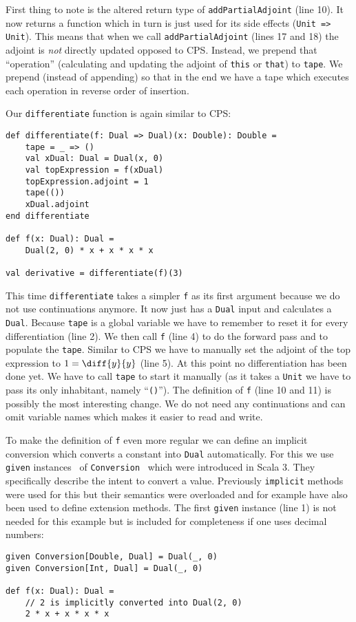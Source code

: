First thing to note is the altered return type of \lstinline{addPartialAdjoint} (line 10). It now returns a function which in turn is just used for its side effects (\lstinline{Unit => Unit}). This means that when we call \lstinline{addPartialAdjoint} (lines 17 and 18) the adjoint is \emph{not} directly updated opposed to CPS. Instead, we prepend that ``operation'' (calculating and updating the adjoint of \lstinline{this} or \lstinline{that}) to \lstinline{tape}. We prepend (instead of appending) so that in the end we have a tape which executes each operation in reverse order of insertion.

Our \lstinline{differentiate} function is again similar to CPS:
\begin{lstlisting}
def differentiate(f: Dual => Dual)(x: Double): Double =
    tape = _ => ()
    val xDual: Dual = Dual(x, 0)
    val topExpression = f(xDual)
    topExpression.adjoint = 1
    tape(())
    xDual.adjoint
end differentiate

def f(x: Dual): Dual =
    Dual(2, 0) * x + x * x * x

val derivative = differentiate(f)(3)
\end{lstlisting}
This time \lstinline{differentiate} takes a simpler \lstinline{f} as its first argument because we do not use continuations anymore. It now just has a \lstinline{Dual} input and calculates a \lstinline{Dual}. Because \lstinline{tape} is a global variable we have to remember to reset it for every differentiation (line 2). We then call \lstinline{f} (line 4) to do the forward pass and to populate the \lstinline{tape}. Similar to CPS we have to manually set the adjoint of the top expression to $1 = \diff{y}{y}$ (line 5). At this point no differentiation has been done yet. We have to call \lstinline{tape} to start it manually (as it takes a \lstinline{Unit} we have to pass its only inhabitant, namely ``\lstinline{()}''). The definition of \lstinline{f} (line 10 and 11) is possibly the most interesting change. We do not need any continuations and can omit variable names which makes it easier to read and write.

To make the definition of \lstinline{f} even more regular we can define an implicit conversion which converts a constant into \lstinline{Dual} automatically. For this we use \lstinline{given} instances~\cite{givensScala3} of \lstinline{Conversion}~\cite{conversionsScala3} which were introduced in Scala 3. They specifically describe the intent to convert a value. Previously \lstinline{implicit} methods were used for this but their semantics were overloaded and for example have also been used to define extension methods. The first \lstinline{given} instance (line 1) is not needed for this example but is included for completeness if one uses decimal numbers:
\begin{lstlisting}
given Conversion[Double, Dual] = Dual(_, 0)
given Conversion[Int, Dual] = Dual(_, 0)

def f(x: Dual): Dual =
    // 2 is implicitly converted into Dual(2, 0)
    2 * x + x * x * x
\end{lstlisting}

